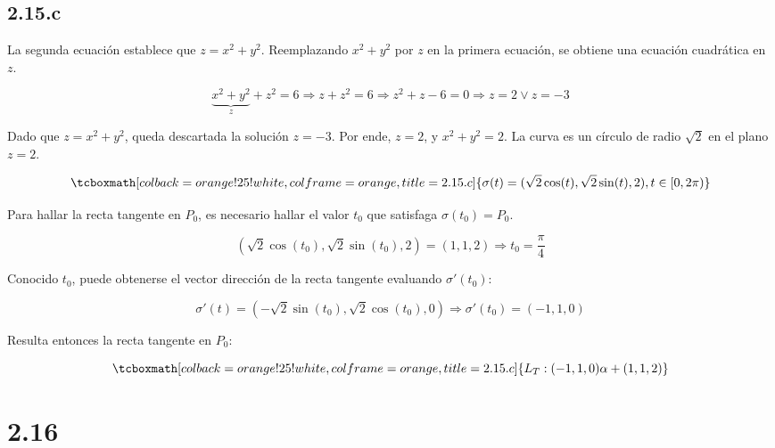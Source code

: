 \documentclass{article}
\begin{document}
\subsection*{2.15.c}
\label{subsec:2.15.c}

La segunda ecuación establece que $z = x^2 + y^2$. Reemplazando $x^2 + y^2$ por $z$ en la primera ecuación, se obtiene una ecuación cuadrática en $z$.

\begin{equation}
\underbrace{x^2 + y^2}_{z} + z^2 = 6 \Rightarrow z + z^2 = 6 \Rightarrow z^2 + z - 6 = 0 \Rightarrow z = 2 \vee z = -3
\end{equation}

Dado que $z = x^2 + y^2$, queda descartada la solución $z = -3$. Por ende, $z = 2$, y $x^2 + y^2 = 2$. La curva es un círculo de radio $\sqrt{2}$ en el plano $z = 2$.

\begin{equation}
\tcboxmath[colback=orange!25!white,colframe=orange,title=2.15.c]
{
\sigma(t) = (\sqrt{2} \cos(t), \sqrt{2} \sin(t), 2), t \in [0, 2\pi)
}
\end{equation}

Para hallar la recta tangente en $P_0$, es necesario hallar el valor $t_0$ que satisfaga $\sigma(t_0) = P_0$.

\begin{equation}
(\sqrt{2} \cos(t_0), \sqrt{2} \sin(t_0), 2) = (1, 1, 2) \Rightarrow t_0 = \frac{\pi}{4}
\end{equation}

Conocido $t_0$, puede obtenerse el vector dirección de la recta tangente evaluando $\sigma'(t_0)$:

\begin{equation}
\sigma'(t) = (-\sqrt{2} \sin(t_0), \sqrt{2} \cos(t_0), 0) \Rightarrow \sigma'(t_0) = (-1, 1, 0)
\end{equation}

Resulta entonces la recta tangente en $P_0$:

\begin{equation}
\tcboxmath[colback=orange!25!white,colframe=orange,title=2.15.c]
{
L_T: (-1, 1, 0) \alpha + (1, 1, 2)
}
\end{equation}

\section*{2.16}
\label{sec:2.16}
\end{document}
